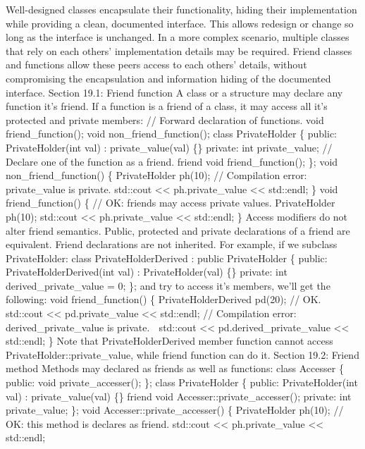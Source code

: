 Well-designed classes encapsulate their functionality, hiding their
implementation while providing a clean, documented interface. This
allows redesign or change so long as the interface is unchanged. In a
more complex scenario, multiple classes that rely on each others'
implementation details may be required. Friend classes and functions
allow these peers access to each others' details, without compromising
the encapsulation and information hiding of the documented interface.
Section 19.1: Friend function A class or a structure may declare any
function it's friend. If a function is a friend of a class, it may
access all it's protected and private members: // Forward declaration of
functions. void friend\_function(); void non\_friend\_function(); class
PrivateHolder \{ public: PrivateHolder(int val) : private\_value(val)
\{\} private: int private\_value; // Declare one of the function as a
friend. friend void friend\_function(); \}; void non\_friend\_function()
\{ PrivateHolder ph(10); // Compilation error: private\_value is
private. std::cout \textless\textless{} ph.private\_value
\textless\textless{} std::endl; \} void friend\_function() \{ // OK:
friends may access private values. PrivateHolder ph(10); std::cout
\textless\textless{} ph.private\_value \textless\textless{} std::endl;
\} Access modiﬁers do not alter friend semantics. Public, protected and
private declarations of a friend are equivalent. Friend declarations are
not inherited. For example, if we subclass PrivateHolder: class
PrivateHolderDerived : public PrivateHolder \{ public:
PrivateHolderDerived(int val) : PrivateHolder(val) \{\} private: int
derived\_private\_value = 0; \}; and try to access it's members, we'll
get the following: void friend\_function() \{ PrivateHolderDerived
pd(20); // OK. std::cout \textless\textless{} pd.private\_value
\textless\textless{} std::endl; // Compilation error:
derived\_private\_value is private.  std::cout \textless\textless{}
pd.derived\_private\_value \textless\textless{} std::endl; \} Note that
PrivateHolderDerived member function cannot access
PrivateHolder::private\_value, while friend function can do it. Section
19.2: Friend method Methods may declared as friends as well as
functions: class Accesser \{ public: void private\_accesser(); \}; class
PrivateHolder \{ public: PrivateHolder(int val) : private\_value(val)
\{\} friend void Accesser::private\_accesser(); private: int
private\_value; \}; void Accesser::private\_accesser() \{ PrivateHolder
ph(10); // OK: this method is declares as friend. std::cout
\textless\textless{} ph.private\_value \textless\textless{} std::endl;
